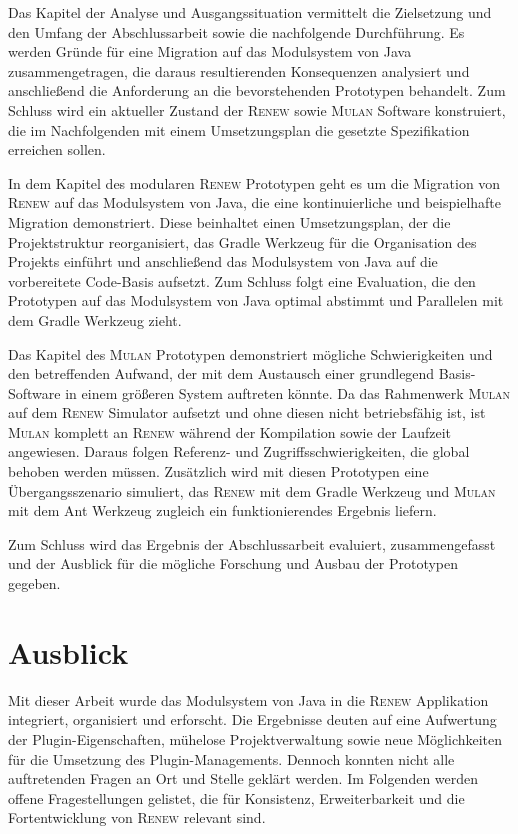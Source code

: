 Das Kapitel der Analyse und Ausgangssituation vermittelt die Zielsetzung und den Umfang der Abschlussarbeit sowie die nachfolgende Durchführung. Es werden Gründe für eine Migration auf das Modulsystem von Java zusammengetragen, die daraus resultierenden Konsequenzen analysiert und anschließend die Anforderung an die bevorstehenden Prototypen behandelt. Zum Schluss wird ein aktueller Zustand der \textsc{Renew} sowie \textsc{Mulan} Software konstruiert, die im Nachfolgenden mit einem Umsetzungsplan die gesetzte Spezifikation erreichen sollen.\bigbreak

In dem Kapitel des modularen \textsc{Renew} Prototypen geht es um die Migration von \textsc{Renew} auf das Modulsystem von Java, die eine kontinuierliche und beispielhafte Migration demonstriert. Diese beinhaltet einen Umsetzungsplan, der die Projektstruktur reorganisiert, das Gradle Werkzeug für die Organisation des Projekts einführt und anschließend das Modulsystem von Java auf die vorbereitete Code-Basis aufsetzt. Zum Schluss folgt eine Evaluation, die den Prototypen auf das Modulsystem von Java optimal abstimmt und Parallelen mit dem Gradle Werkzeug zieht.\bigbreak

Das Kapitel des \textsc{Mulan} Prototypen demonstriert mögliche Schwierigkeiten und den betreffenden Aufwand, der mit dem Austausch einer grundlegend Basis-Software in einem größeren System auftreten könnte. Da das Rahmenwerk \textsc{Mulan} auf dem \textsc{Renew} Simulator aufsetzt und ohne diesen nicht betriebsfähig ist, ist \textsc{Mulan} komplett an \textsc{Renew} während der Kompilation sowie der Laufzeit angewiesen. Daraus folgen Referenz- und Zugriffsschwierigkeiten, die global behoben werden müssen. Zusätzlich wird mit diesen Prototypen eine Übergangsszenario simuliert, das \textsc{Renew} mit dem Gradle Werkzeug und \textsc{Mulan} mit dem Ant Werkzeug zugleich ein funktionierendes Ergebnis liefern. \bigbreak

Zum Schluss wird das Ergebnis der Abschlussarbeit evaluiert, zusammengefasst und der Ausblick für die mögliche Forschung und Ausbau der Prototypen gegeben. 


\section{Ausblick} 
	Mit dieser Arbeit wurde das Modulsystem von Java in die \textsc{Renew} Applikation integriert, organisiert und erforscht. Die Ergebnisse deuten auf eine Aufwertung der Plugin-Eigenschaften, mühelose Projektverwaltung sowie neue Möglichkeiten für die Umsetzung des Plugin-Managements. Dennoch konnten nicht alle auftretenden Fragen an Ort und Stelle geklärt werden.\bigbreak
	Im Folgenden werden offene Fragestellungen gelistet, die für Konsistenz, Erweiterbarkeit und die Fortentwicklung von \textsc{Renew} relevant sind.  
	
